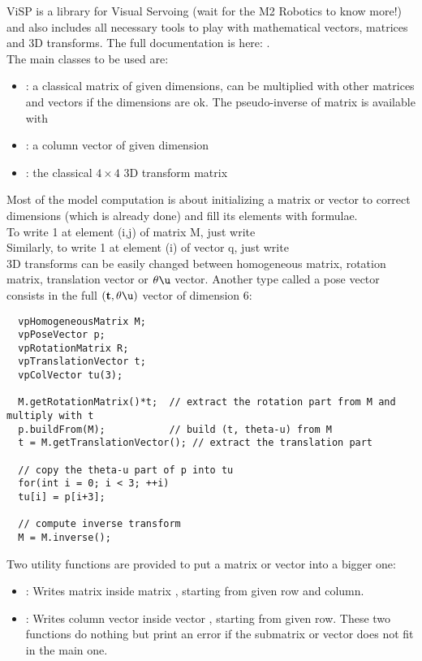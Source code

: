 \documentclass{ecnreport}
\begin{document}
  ViSP is a library for Visual Servoing (wait for the M2 Robotics to know more!) and also includes all necessary tools to play with mathematical vectors, matrices and 3D transforms.
  The full documentation is here: .\\
  The main classes to be used are:
  \begin{itemize}
    \item {}: a classical matrix of given dimensions, can be multiplied with other matrices and vectors if the dimensions are ok. The pseudo-inverse of matrix 
    is available with 
    \item {}: a column vector of given dimension
    \item {}: the classical $4\times 4$ 3D transform matrix
  \end{itemize}
  Most of the model computation is about initializing a matrix or vector to correct dimensions (which is already done) and fill its elements with formulae.\\
  To write 1 at element (i,j) of matrix M, just write \\
  Similarly, to write 1 at element (i) of vector q, just write \\
  
  3D transforms can be easily changed between homogeneous matrix, rotation matrix, translation vector or $\theta\u$ vector. Another type called a pose vector
  consists in the full $(\mathbf{t}, \theta\u)$ vector of dimension 6:
  \cppstyle
  \begin{lstlisting}
  vpHomogeneousMatrix M;
  vpPoseVector p;
  vpRotationMatrix R;
  vpTranslationVector t;
  vpColVector tu(3);
  
  M.getRotationMatrix()*t;	// extract the rotation part from M and multiply with t
  p.buildFrom(M);			// build (t, theta-u) from M
  t = M.getTranslationVector();	// extract the translation part
  
  // copy the theta-u part of p into tu
  for(int i = 0; i < 3; ++i)
  tu[i] = p[i+3];
  
  // compute inverse transform
  M = M.inverse();
  \end{lstlisting}
  
  Two utility functions are provided to put a matrix or vector into a bigger one:
  \begin{itemize}
    \item {}: Writes matrix  inside matrix , starting from given row and column.
    \item {}: Writes column vector  inside vector , starting from given row. These two functions do nothing but print an error
    if the submatrix or vector does not fit in the main one.
  \end{itemize}
  
\end{document}
